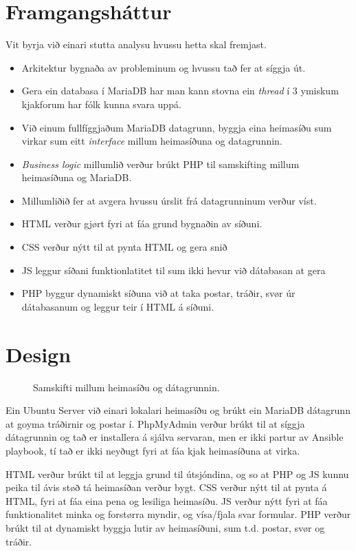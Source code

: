 \documentclass{article}
\begin{document}
\section{Framgangsháttur}
\par Vit byrja við einari stutta analysu hvussu hetta skal fremjast.
\begin{itemize}
    \item Arkitektur bygnaða av probleminum og hvussu tað fer at síggja út.
    \item Gera ein databasa í MariaDB har man kann stovna ein \textit{thread} í 3 ymiskum kjakforum har fólk kunna svara uppá.
    \item Við einum fullfíggjaðum MariaDB datagrunn, byggja eina heimasíðu sum virkar sum eitt \textit{interface} millum heimasíðuna og datagrunnin.
    \item \textit{Business logic} millumlið verður brúkt PHP til samskifting millum
            \newline heimasíðuna og MariaDB.
    \item Millumliðið fer at avgera hvussu úrslit frá datagrunninum verður víst.    
\end{itemize}

\begin{itemize}
    \item HTML verður gjørt fyri at fáa grund bygnaðin av síðuni.
    \item CSS verður nýtt til at pynta HTML og gera snið
    \item JS leggur síðani funktionlatitet til sum ikki hevur við dátabasan at gera
    \item PHP byggur dynamiskt síðuna við at taka postar, tráðir, svør úr dátabasanum
og leggur teir í HTML á síðuni.
\end{itemize}


\section{Design}
\begin{figure}[H]
    \centering
     
    \caption{Samskifti millum heimasíðu og dátagrunnin.}
    \label{fig:html-cs-db.svg}
\end{figure}

\par Ein Ubuntu Server við einari lokalari heimasíðu og brúkt ein MariaDB dátagrunn
at goyma tráðirnir og postar í.
PhpMyAdmin verður brúkt til at síggja dátagrunnin og tað er installera á sjálva servaran,
men er ikki partur av Ansible playbook, tí tað er ikki neyðugt fyri at fáa kjak heimasíðuna
at virka.
\par HTML verður brúkt til at leggja grund til útsjóndina, og so at PHP og JS kunnu peika
til ávis støð tá heimasíðan verður bygt. CSS verður nýtt til at pynta á HTML, fyri at fáa eina
pena og lesiliga heimasíðu. JS verður nýtt fyri at fáa funktionalitet minka og forstørra myndir,
og vísa/fjala svar formular. PHP verður brúkt til at dynamiskt byggja lutir av
heimasíðuni, sum t.d. postar, svør og tráðir.
\end{document}
